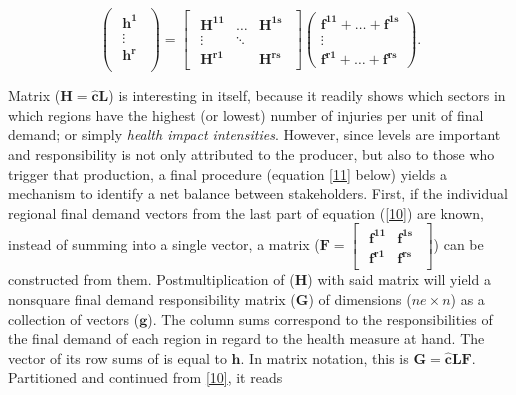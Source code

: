 \documentclass[a4paper,12pt, ]{article}
\begin{document}
\begin{equation} \begin{pmatrix} \begin{array}{c} \mathbf{h^1} \\ \vdots\\ \mathbf{h^r}\\ \end{array} \end{pmatrix} =\begin{bmatrix}
\begin{array}{ccc} \mathbf{H^{11}} & \ldots & \mathbf{H^{1s}} \\ \vdots &  \ddots &  \\ \mathbf{H^{r1}} &  & \mathbf{H^{rs}}
\end{array} \end{bmatrix} \left( \begin{array}{c} \mathbf{f^{11}} +  \ldots  +  \mathbf{f^{1s}} \\ \vdots  \\ \mathbf{f^{r1}}  + 
\ldots  +  \mathbf{f^{rs}} \end{array} \right).
\label{10}
\end{equation}

Matrix ($\mathbf{H}=\mathbf{\hat{c}L}$) is interesting in itself, because it readily shows which sectors in which regions have the highest (or lowest) number of injuries per unit of final demand; or simply \textit{health impact intensities}. However, since levels are important and responsibility is not only attributed to the producer, but also to those who trigger that production, a final procedure (equation \ref{11} below) yields a mechanism to identify a net balance between stakeholders. First, if the individual regional final demand vectors from the last part of equation (\ref{10}) are known, instead of summing into a single vector, a matrix ($\mathbf{F}=\begin{bmatrix} \begin{smallmatrix}
\mathbf{f^{11}}&\mathbf{f^{1s}}\\ \mathbf{f^{r1}}&\mathbf{f^{rs}} \end{smallmatrix} \end{bmatrix}$) can be constructed from them.
Postmultiplication of  ($\mathbf{H}$)  with said matrix will yield a nonsquare final demand responsibility matrix ($\mathbf{G}$) of dimensions ($ne \times n$) as a collection of vectors ($\mathbf{g}$). The column sums correspond to the  responsibilities of the final demand of each region in regard to the health measure at hand. The vector of its row sums of is equal to $\mathbf{h}$. In matrix notation, this is $\mathbf{G}= \mathbf{\hat{c}LF}$. Partitioned and continued from \ref{10}, it reads 
\end{document}
